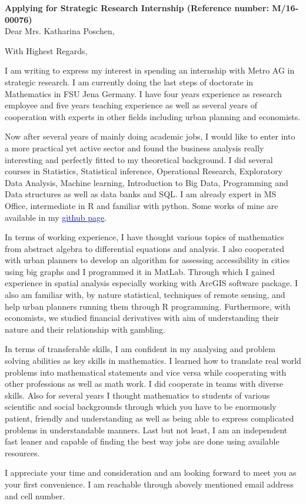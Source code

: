\documentclass[11pt,a4paper,sans]{moderncv}        %
\title{}                               %
\begin{document}
\date{May 17, 2016}
\opening{\textbf{Applying for  Strategic Research Internship (Reference number: M/16-00076)}\\Dear Mrs. Katharina Poschen,}
\closing{With Highest Regards,}
\makelettertitle

I am writing to express my interest in spending an internship with Metro AG in strategic research. I am currently doing the last steps of doctorate in Mathematics in FSU Jena Germany. I have four years experience as research employee and five years teaching experience as well as several years of cooperation with experts in other fields including urban planning and economists.

Now after several years of mainly doing academic jobs, I would like to enter into a more practical yet active sector and found the business analysis really interesting and perfectly fitted to my theoretical background. I did several courses in Statistics, Statistical inference, Operational Research, Exploratory Data Analysis,  Machine learning, Introduction to Big Data, Programming and Data structures as well as data banks and SQL. I am already expert in MS Office, intermediate in R and familiar with python. Some works of mine are available in my  \href{https://github.com/srhumir}{\textcolor{blue}{\underline{github page}}}. 

In terms of working experience, I have thought various topics of mathematics from abstract algebra to differential equations and analysis. I also cooperated with urban planners to develop an algorithm for assessing accessibility in cities using big graphs and I programmed it in MatLab. Through which I gained experience in spatial analysis especially working with ArcGIS software package. I also am familiar with, by nature statistical, techniques of remote sensing, and help urban planners running them through R programming. Furthermore, with economists, we studied financial derivatives with aim of understanding their nature and their relationship with gambling.

In terms of transferable skills, I am confident in my analysing and problem solving abilities as key skills in mathematics. I learned how to translate real world problems into mathematical statements and vice versa while cooperating with other professions as well as math work.  I did cooperate in teams with diverse skills. Also for several years I thought mathematics to students of various scientific and social backgrounds through which you have to be enormously patient, friendly and understanding as well as being able to express complicated problems in understandable manners. Last but not least, I am an independent fast leaner and capable of finding the best way jobs are done using available resources.




 I appreciate your time and consideration and am looking forward to meet you as your first convenience. I am reachable through abovely mentioned email address and cell number.
 \vspace{3mm}
 
\makeletterclosing
\end{document}
